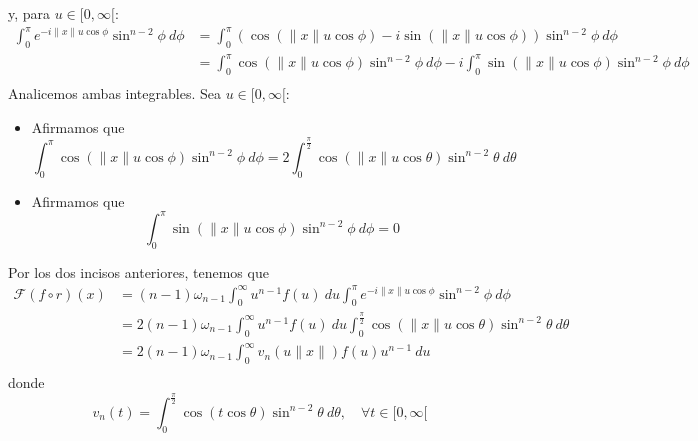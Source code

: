 \documentclass[12pt]{report}
\newcounter{it}
\theoremstyle{largebreak}
\newcommand\norm[1]{\ensuremath{\|#1\|}}
\newcommand{\fou}[1]{\ensuremath{\mathcal{F}#1}}
\begin{document}
\begin{sol}
        y, para $u\in[0,\infty[$:
        \begin{equation*}
            \begin{split}
                \int_{0}^\pi e^{ -i\norm{x}u\cos\phi}\sin^{ n-2}\phi\:d\phi&=\int_{0}^\pi \left(\cos(\norm{x}u\cos\phi)-i\sin(\norm{x}u\cos\phi)\right) \sin^{ n-2}\phi\:d\phi\\
                &=\int_{0}^\pi\cos(\norm{x}u\cos\phi)\sin^{ n-2}\phi\:d\phi-i\int_{0}^\pi\sin(\norm{x}u\cos\phi)\sin^{ n-2}\phi\:d\phi\\
            \end{split}
        \end{equation*}
        Analicemos ambas integrables. Sea $u\in[0,\infty[$:
        \begin{itemize}
            \item Afirmamos que
            \begin{equation*}
                \int_{0}^\pi\cos(\norm{x}u\cos\phi)\sin^{ n-2}\phi\:d\phi=2\int_{0}^{\frac{\pi}{2}}\cos(\norm{x}u\cos\theta)\sin^{ n-2}\theta\:d\theta
            \end{equation*}
            \item Afirmamos que
            \begin{equation*}
                \int_{0}^\pi\sin(\norm{x}u\cos\phi)\sin^{ n-2}\phi\:d\phi=0
            \end{equation*}
        \end{itemize}
        Por los dos incisos anteriores, tenemos que
        \begin{equation*}
            \begin{split}
                \fou{(f\circ r)}(x)&=(n-1)\omega_{n-1}\int_{0}^\infty u^{ n-1}f(u)\:du \int_{0}^\pi e^{ -i\norm{x}u\cos\phi}\sin^{ n-2}\phi\:d\phi\\
                &=2(n-1)\omega_{n-1}\int_{0}^\infty u^{ n-1}f(u)\:du \int_{0}^{\frac{\pi}{2}}\cos(\norm{x}u\cos\theta)\sin^{ n-2}\theta\:d\theta\\
                &=2(n-1)\omega_{n-1}\int_{0}^\infty v_n(u\norm{x})f(u)u^{ n-1}\:du\\
            \end{split}
        \end{equation*}
        donde
        \begin{equation*}
            v_n(t)=\int_{0}^{\frac{\pi}{2}}\cos(t\cos\theta)\sin^{ n-2}\theta\:d\theta,\quad\forall t\in[0,\infty[
        \end{equation*}
    \end{sol}
\end{document}
